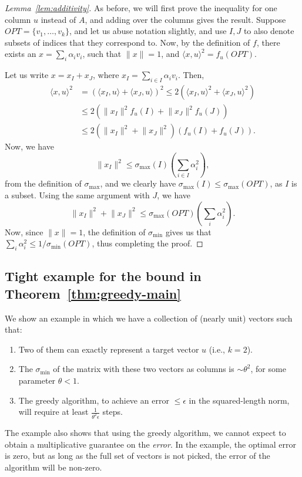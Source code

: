 \documentclass{article}
\newcommand{\norm}[1]{\lVert #1 \rVert}
\newcommand{\enum}[1]{\begin{enumerate} #1 \end{enumerate}}
\newcommand{\iprod}[1]{\langle #1 \rangle}
\newcommand{\opt}{OPT}
\begin{document}
\begin{proof} [Lemma~\ref{lem:additivity}]
As before, we will first prove the inequality for one column $u$ instead of $A$, and adding over the columns gives the result. Suppose $\opt = \{v_1, \dots, v_k\}$, and let us abuse notation slightly, and use $I, J$ to also denote subsets of indices that they correspond to. Now, by the definition of $f$, there exists an $x = \sum_i \alpha_i v_i$, such that $\norm{x}=1$, and $\iprod{x, u}^2 = f_u(\opt)$.

Let us write $x = x_I + x_J$, where $x_I = \sum_{i \in I} \alpha_i v_i$. Then,
\begin{align*}
\iprod{x, u}^2 &= (\iprod{x_I, u} + \iprod{x_J, u})^2 \le 2(\iprod{x_I, u}^2 + \iprod{x_J, u}^2 ) \\
&\le 2(\norm{x_I}^2 f_u(I) + \norm{x_J}^2 f_u(J) ) \\
&\le 2(\norm{x_I}^2 + \norm{x_J}^2) (f_u(I) + f_u(J)).
\end{align*}
Now, we have
\[ \norm{x_I}^2 \le \sigma_{\max}(I)(\sum_{i \in I} \alpha_i^2),\]
from the definition of $\sigma_{\max}$, and we clearly have $\sigma_{\max}(I)\le \sigma_{\max}(\opt)$, as $I$ is a subset. Using the same argument with $J$, we have
\[ \norm{x_I}^2 + \norm{x_J}^2 \le \sigma_{\max}(\opt) (\sum_i \alpha_i^2). \]
Now, since $\norm{x}=1$, the definition of $\sigma_{\min}$ gives us that $\sum_i \alpha_i^2 \le 1/\sigma_{\min}(\opt)$, thus completing the proof.
\end{proof}





\subsection{Tight example for the bound in Theorem~\ref{thm:greedy-main}} \label{app:tight-ex}

We show an example in which we have a collection of (nearly unit)
vectors such that:
\enum{
\item Two of them can exactly represent a target vector
$u$ (i.e., $k=2$). 
\item The $\sigma_{\min}$ of the matrix with these two vectors as
columns is $\sim \theta^2$, for some parameter $\theta <1$.
\item The greedy algorithm, to achieve an error $\le \epsilon$ in
the squared-length norm, will require at least $\frac{1}{\theta^2
  \epsilon}$ steps.
}

The example also shows that using the greedy algorithm, we cannot
expect to obtain a multiplicative guarantee on the {\em error}. In the
example, the optimal error is zero, but as long as the full set of
vectors is not picked, the error of the algorithm will be non-zero.
\end{document}

